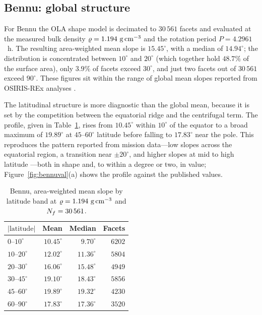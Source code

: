 \subsection{Bennu: global structure}
\label{sec:bennu}

For Bennu the OLA shape model \citep{barnouin2020,daly2020} is decimated to
$30\,561$ facets and evaluated at the measured bulk density
$\varrho=1.194\ \mathrm{g\,cm^{-3}}$ and the rotation period $P=4.2961$~h. The
resulting area-weighted mean slope is $15.45^{\circ}$, with a median of
$14.94^{\circ}$; the distribution is concentrated between $10^{\circ}$ and
$20^{\circ}$ (which together hold $48.7\%$ of the surface area), only $3.9\%$
of facets exceed $30^{\circ}$, and just two facets out of $30\,561$ exceed
$90^{\circ}$. These figures sit within the range of global mean slopes reported
from OSIRIS-REx analyses \citep{scheeres2019,jawin2020}.

The latitudinal structure is more diagnostic than the global mean, because it
is set by the competition between the equatorial ridge and the centrifugal
term. The profile, given in Table~\ref{tab:bennulat}, rises from $10.45^{\circ}$
within $10^{\circ}$ of the equator to a broad maximum of $19.89^{\circ}$ at
$45$--$60^{\circ}$ latitude before falling to $17.83^{\circ}$ near the pole.
This reproduces the pattern reported from mission data---low slopes across the
equatorial region, a transition near $\pm 20^{\circ}$, and higher slopes at
mid to high latitude \citep{scheeres2019}---both in shape and, to within a
degree or two, in value; Figure~\ref{fig:bennuval}(a) shows the profile against
the published values.

\begin{table}[t]
\centering
\small
\caption{Bennu, area-weighted mean slope by latitude band at
$\varrho = 1.194\ \mathrm{g\,cm^{-3}}$ and $N_{f} = 30\,561$.}
\label{tab:bennulat}
\begin{tabular}{lrrr}
\toprule
$\lvert\text{latitude}\rvert$ & Mean & Median & Facets \\
\midrule
$0$--$10^{\circ}$   & $10.45^{\circ}$ & $9.70^{\circ}$  & $6202$ \\
$10$--$20^{\circ}$  & $12.02^{\circ}$ & $11.36^{\circ}$ & $5804$ \\
$20$--$30^{\circ}$  & $16.06^{\circ}$ & $15.48^{\circ}$ & $4949$ \\
$30$--$45^{\circ}$  & $19.10^{\circ}$ & $18.43^{\circ}$ & $5856$ \\
$45$--$60^{\circ}$  & $19.89^{\circ}$ & $19.32^{\circ}$ & $4230$ \\
$60$--$90^{\circ}$  & $17.83^{\circ}$ & $17.36^{\circ}$ & $3520$ \\
\bottomrule
\end{tabular}
\end{table}


